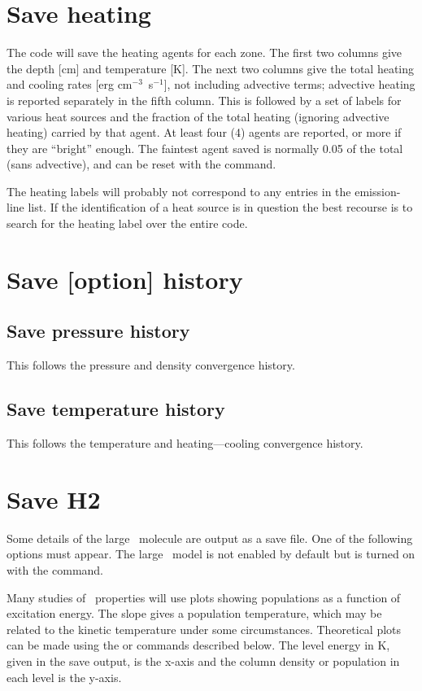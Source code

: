 \section{Save heating}

The code will save the heating agents for each zone.  The first two columns
give the depth [cm] and temperature [K].  The next two columns give the
total heating and cooling rates [erg cm$^{-3}$~s$^{-1}$], not including
advective terms; advective heating is reported separately in the fifth column.
This is followed by a set of labels for various heat sources and the fraction
of the total heating (ignoring advective heating) carried by that agent.
At least four (4) agents are reported, or more if they are ``bright'' enough.
The faintest agent saved is normally 0.05 of the total (sans advective), and
can be reset with the  command.

The heating labels will probably not correspond to any entries in the
emission-line list.  If the identification of a heat source is in question
the best recourse is to search for the heating label over the entire code.

\section{Save [option] history}

\subsection{Save pressure history}

This follows the pressure and density convergence history.

\subsection{Save temperature history}

This follows the temperature and heating---cooling convergence history.

\section{Save H2}

Some details of the large \htwo\ molecule are output as a save file.  One
of the following options must appear.  The large \htwo\ model is not enabled
by default but is turned on with the  command.

Many studies of \htwo\ properties will use plots showing populations as a
function of excitation energy.  The slope gives a population temperature,
which may be related to the kinetic temperature under some circumstances.
Theoretical plots can be made using the
or  commands described below.
The level energy in K, given in
the save output, is the x-axis and the column density or population in
each level is the y-axis.

